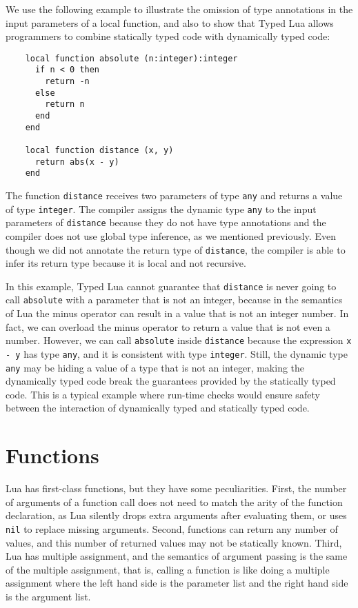 We use the following example to illustrate the omission of type
annotations in the input parameters of a local function,
and also to show that Typed Lua allows programmers to combine
statically typed code with dynamically typed code:
\begin{verbatim}
    local function absolute (n:integer):integer
      if n < 0 then
        return -n
      else
        return n
      end
    end

    local function distance (x, y)
      return abs(x - y)
    end
\end{verbatim}

The function \texttt{distance} receives two parameters of type \texttt{any}
and returns a value of type \texttt{integer}.
The compiler assigns the dynamic type \texttt{any} to the input
parameters of \texttt{distance} because they do not have type annotations
and the compiler does not use global type inference, as we mentioned
previously.
Even though we did not annotate the return type of \texttt{distance},
the compiler is able to infer its return type because it is local
and not recursive.

In this example, Typed Lua cannot guarantee that \texttt{distance} is never
going to call \texttt{absolute} with a parameter that is not an integer,
because in the semantics of Lua the minus operator can result in a
value that is not an integer number.
In fact, we can overload the minus operator to return a value that is
not even a number.
However, we can call \texttt{absolute} inside \texttt{distance}
because the expression \texttt{x - y} has type \texttt{any},
and it is consistent with type \texttt{integer}.
Still, the dynamic type \texttt{any} may be hiding a value of a type
that is not an integer, making the dynamically typed code break the
guarantees provided by the statically typed code.
This is a typical example where run-time checks would ensure safety
between the interaction of dynamically typed and statically typed code.

\section{Functions}
\label{sec:functions}

Lua has first-class functions, but they have some peculiarities.
First, the number of arguments of a function call does
not need to match the arity of the function declaration, as Lua silently
drops extra arguments after evaluating them, or uses \texttt{nil} to
replace missing arguments.
Second, functions can return any number of values,
and this number of returned values may not be statically known.
Third, Lua has multiple assignment, and the semantics
of argument passing is the same of the multiple assignment, that is,
calling a function is like doing a multiple assignment where the
left hand side is the parameter list and the right hand side is the
argument list.

